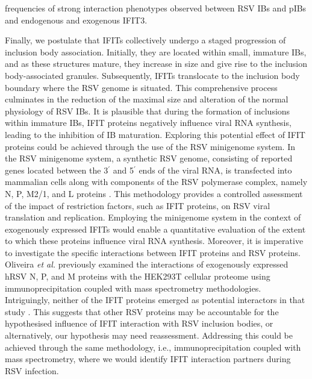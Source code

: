 frequencies of strong interaction phenotypes observed between RSV IBs and pIBs and endogenous and exogenous IFIT3.

Finally, we postulate that IFITs collectively undergo a staged progression of inclusion body association. Initially, they are located within small, immature IBs, and as these structures mature, they increase in size and give rise to the inclusion body-associated granules. Subsequently, IFITs translocate to the inclusion body boundary where the RSV genome is situated. This comprehensive process culminates in the reduction of the maximal size and alteration of the normal physiology of RSV IBs. It is plausible that during the formation of inclusions within immature IBs, IFIT proteins negatively influence viral RNA synthesis, leading to the inhibition of IB maturation. Exploring this potential effect of IFIT proteins could be achieved through the use of the RSV minigenome system. In the RSV minigenome system, a synthetic RSV genome, consisting of reported genes located between the 3$^{\prime}$ and 5$^{\prime}$ ends of the viral RNA, is transfected into mammalian cells along with components of the RSV polymerase complex, namely N, P, M2/1, and L proteins \cite{Teng2016UseTranscription}. This methodology provides a controlled assessment of the impact of restriction factors, such as IFIT proteins, on RSV viral translation and replication. Employing the minigenome system in the context of exogenously expressed IFITs would enable a quantitative evaluation of the extent to which these proteins influence viral RNA synthesis. Moreover, it is imperative to investigate the specific interactions between IFIT proteins and RSV proteins. Oliveira \textit{et al.} previously examined the interactions of exogenously expressed hRSV N, P, and M proteins with the HEK293T cellular proteome using immunoprecipitation coupled with mass spectrometry methodologies. Intriguingly, neither of the IFIT proteins emerged as potential interactors in that study \cite{Oliveira2013HumanCells}. This suggests that other RSV proteins may be accountable for the hypothesised influence of IFIT interaction with RSV inclusion bodies, or alternatively, our hypothesis may need reassessment. Addressing this could be achieved through the same methodology, i.e., immunoprecipitation coupled with mass spectrometry, where we would identify IFIT interaction partners during RSV infection.

